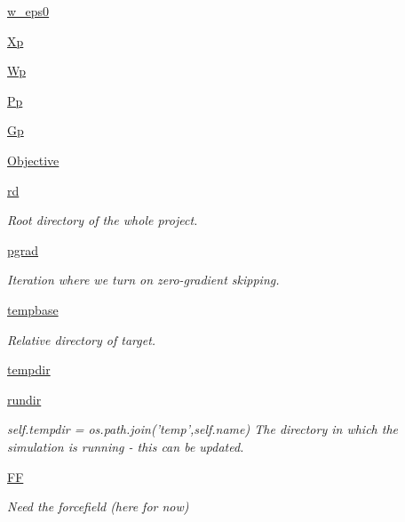 \begin{DoxyCompactItemize}
\hyperlink{classforcebalance_1_1liquid_1_1Liquid_a75ad3ea94ec845e91499f858e7be5f27}{w\-\_\-eps0}
\item 
\hyperlink{classforcebalance_1_1liquid_1_1Liquid_a551536bc5fa6e40eeeba61619ebe072d}{Xp}
\item 
\hyperlink{classforcebalance_1_1liquid_1_1Liquid_a34fc96849307fd94c2cb41705ad4445c}{Wp}
\item 
\hyperlink{classforcebalance_1_1liquid_1_1Liquid_a31ab3ddf113f6998b67bbc2bad3998f5}{Pp}
\item 
\hyperlink{classforcebalance_1_1liquid_1_1Liquid_a3c2c643beab52bc7a25256588566ee7e}{Gp}
\item 
\hyperlink{classforcebalance_1_1liquid_1_1Liquid_a93b9986b3c980abc9cf8f65765864e12}{Objective}
\item 
\hyperlink{classforcebalance_1_1target_1_1Target_a4edb69fbde792e9f2f27e54b7c978c8e}{rd}
\begin{DoxyCompactList}\small\item\em Root directory of the whole project. \end{DoxyCompactList}\item 
\hyperlink{classforcebalance_1_1target_1_1Target_a684235b4332b608c4e2da22982c2fdfa}{pgrad}
\begin{DoxyCompactList}\small\item\em Iteration where we turn on zero-\/gradient skipping. \end{DoxyCompactList}\item 
\hyperlink{classforcebalance_1_1target_1_1Target_ae5b544d3e11365865813ef3d626ef81d}{tempbase}
\begin{DoxyCompactList}\small\item\em Relative directory of target. \end{DoxyCompactList}\item 
\hyperlink{classforcebalance_1_1target_1_1Target_aa1f01b5b78db253b5b66384ed11ed193}{tempdir}
\item 
\hyperlink{classforcebalance_1_1target_1_1Target_a6872de5b2d4273b82336ea5b0da29c9e}{rundir}
\begin{DoxyCompactList}\small\item\em self.\-tempdir = os.\-path.\-join('temp',self.\-name) The directory in which the simulation is running -\/ this can be updated. \end{DoxyCompactList}\item 
\hyperlink{classforcebalance_1_1target_1_1Target_a38a37919783141ea37fdcf8b00ce0aaf}{F\-F}
\begin{DoxyCompactList}\small\item\em Need the forcefield (here for now) \end{DoxyCompactList}\item 

\end{DoxyCompactItemize}
